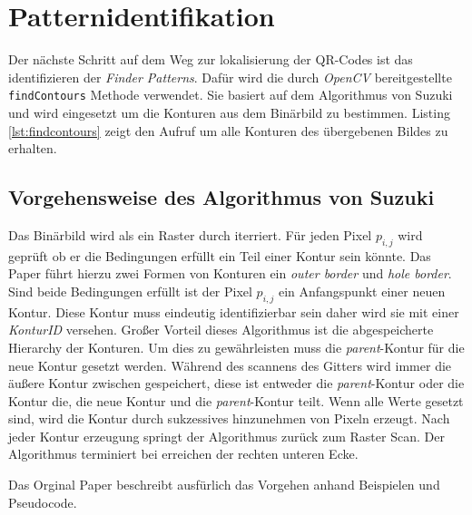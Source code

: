 \chapter{Patternidentifikation}
Der nächste Schritt auf dem Weg zur lokalisierung der QR-Codes ist das identifizieren der \emph{Finder Patterns}. Dafür wird die durch \emph{OpenCV} bereitgestellte \texttt{findContours} Methode verwendet. Sie basiert auf dem Algorithmus von Suzuki und wird eingesetzt um die Konturen aus dem Binärbild zu bestimmen.
Listing \ref{lst:findcontours} zeigt den Aufruf um alle Konturen des übergebenen Bildes zu erhalten.

\section{Vorgehensweise des Algorithmus von Suzuki}
Das Binärbild wird als ein Raster durch iterriert. Für jeden Pixel $p_{i,j}$ wird geprüft ob er die Bedingungen erfüllt ein Teil einer Kontur sein könnte. Das Paper     führt hierzu zwei Formen von Konturen ein \emph{outer border} und \emph{hole border}. Sind beide Bedingungen erfüllt ist der Pixel $p_{i,j}$ ein Anfangspunkt einer neuen Kontur. Diese Kontur muss eindeutig identifizierbar sein daher wird sie mit einer \emph{KonturID} versehen. Großer Vorteil dieses Algorithmus ist die abgespeicherte Hierarchy der Konturen. Um dies zu gewährleisten muss die \emph{parent}-Kontur für die neue Kontur gesetzt werden. Während des scannens des Gitters wird immer die äußere Kontur zwischen gespeichert, diese ist entweder die \emph{parent}-Kontur oder die Kontur die, die neue Kontur und die \emph{parent}-Kontur teilt. Wenn alle Werte gesetzt sind, wird die Kontur durch sukzessives hinzunehmen von Pixeln erzeugt. Nach jeder Kontur erzeugung springt der Algorithmus zurück zum Raster Scan. Der Algorithmus terminiert bei erreichen der rechten unteren Ecke.

Das Orginal Paper beschreibt ausfürlich das Vorgehen anhand Beispielen und Pseudocode.

